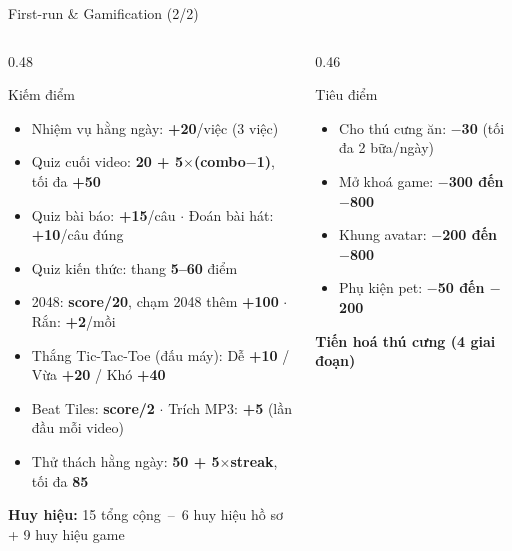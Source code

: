 \documentclass[aspectratio=169]{beamer}
\begin{document}
\begin{frame}{First-run \& Gamification (2/2)}
  \begin{columns}
    \begin{column}{0.48\textwidth}
      \begin{block}{\small Kiếm điểm}
        {\tiny
        \begin{itemize}\itemsep1pt
          \item Nhiệm vụ hằng ngày: \textbf{+20}/việc (3 việc)
          \item Quiz cuối video: \textbf{20 + 5$\times$(combo$-$1)}, tối đa \textbf{+50}
          \item Quiz bài báo: \textbf{+15}/câu $\cdot$ Đoán bài hát: \textbf{+10}/câu đúng
          \item Quiz kiến thức: thang \textbf{5--60} điểm
          \item 2048: \textbf{score/20}, chạm 2048 thêm \textbf{+100} $\cdot$ Rắn: \textbf{+2}/mồi
          \item Thắng Tic-Tac-Toe (đấu máy): Dễ \textbf{+10} / Vừa \textbf{+20} / Khó \textbf{+40}
          \item Beat Tiles: \textbf{score/2} $\cdot$ Trích MP3: \textbf{+5} (lần đầu mỗi video)
          \item Thử thách hằng ngày: \textbf{50 + 5$\times$streak}, tối đa \textbf{85}
        \end{itemize}}
      \end{block}
      \vspace{1mm}
      {\tiny\textbf{Huy hiệu:} 15 tổng cộng~--~6 huy hiệu hồ sơ + 9 huy hiệu game}
    \end{column}
    \begin{column}{0.46\textwidth}
      \begin{alertblock}{\small Tiêu điểm}
        {\tiny
        \begin{itemize}\itemsep2pt
          \item Cho thú cưng ăn: \textbf{$-$30} (tối đa 2 bữa/ngày)
          \item Mở khoá game: \textbf{$-$300 đến $-$800}
          \item Khung avatar: \textbf{$-$200 đến $-$800}
          \item Phụ kiện pet: \textbf{$-$50 đến $-$200}
        \end{itemize}}
      \end{alertblock}
      \vspace{1.5mm}
      {\small\textbf{Tiến hoá thú cưng (4 giai đoạn)}}\vspace{1mm}

\end{column}
\end{columns}
\end{frame}
\end{document}
